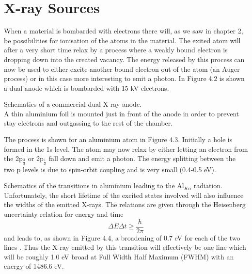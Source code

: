              \section{X-ray Sources}

             When a material is bombarded with electrons there will, as
          we saw in chapter 2, be possibilities for ionisation of the
          atoms in the material. The exited atom will after a very
          short time relax by a process where a weakly bound electron
          is dropping down into the created vacancy. The energy
          released by this process can now be used to either excite
          another bound electron out of the atom (an Auger process) or
          in this case more interesting to emit a photon. In Figure
          4.2 is shown a dual anode which is bombarded with 15 kV
          electrons.

\vspace{8cm}

              Schematics of a commercial dual
          X-ray anode.\\



           A thin aluminium foil is mounted just in front of
          the anode in order to prevent stay electrons and outgassing
          to the rest of the chamber.


           The process is shown for an aluminium atom  in
          Figure 4.3. Initially a hole is formed in the 1s level.  The
          atom may now relax by either letting an  electron  from  the
          2p$_{\frac{3}{2}}$ or 2p$_{\frac{1}{2}}$ fall down and  emit
          a photon. The energy splitting between the two  p  levels  is
          due to spin-orbit coupling and is very small (0.4-0.5 eV).\\



\vspace{14cm}

        Schematics of the transitions in
          aluminium leading to the Al$_{K\alpha}$ radiation.\\

          Unfortunately, the short lifetime of the excited states
          involved will also influence the widths of the emitted
          X-rays. The relations are given through the Heisenberg
          uncertainty relation for energy and time \begin{equation}
          \Delta E \Delta t \geq \frac{h}{2\pi} \end{equation} and
          leads to, as shown in Figure 4.4, a broadening of 0.7 eV
          for each of the two lines \cite{siegbahn1}. Thus the X-ray emitted by this
          transition will effectively be one line which will be roughly
          1.0 eV broad at Full Width Half Maximum (FWHM) with an
          energy of 1486.6 eV.\\

